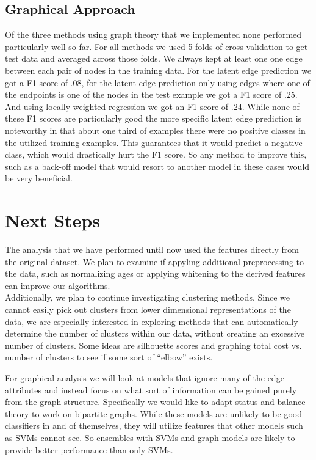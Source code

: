 \documentclass[twoside,twocolumn,paper=letter]{article}
\begin{document}
\subsection{Graphical Approach}

Of the three methods using graph theory that we implemented none performed particularly well so far. For all methods we used 5 folds of cross-validation to get test data and averaged across those folds. We always kept at least one one edge between each pair of nodes in the training data. For the latent edge prediction we got a F1 score of .08, for the latent edge prediction only using edges where one of the endpoints is one of the nodes in the test example we got a F1 score of .25. And using locally weighted regression we got an F1 score of .24. While none of these F1 scores are particularly good the more specific latent edge prediction is noteworthy in that about one third of examples there were no positive classes in the utilized training examples. This guarantees that it would predict a negative class, which would drastically hurt the F1 score. So any method to improve this, such as a back-off model that would resort to another model in these cases would be very beneficial.
\section{Next Steps}

The analysis that we have performed until now used the features directly from
the original dataset. We plan to examine if appyling additional preprocessing to
the data, such as normalizing ages or applying whitening to the derived features
can improve our algorithms.\\

Additionally, we plan to continue investigating clustering methods. Since we
cannot easily pick out clusters from lower dimensional representations of the
data, we are especially interested in exploring methods that can automatically
determine the number of clusters within our data, without creating an excessive
number of clusters. Some ideas are silhouette scores and graphing total cost vs. number of clusters to see if some sort of ``elbow'' exists.

For graphical analysis we will look at models that ignore many of the edge attributes and instead focus on what sort of information can be gained purely from the graph structure. Specifically we would like to adapt status and balance theory to work on bipartite graphs. While these models are unlikely to be good classifiers in and of themselves, they will utilize features that other models such as SVMs cannot see. So ensembles with SVMs and graph models are likely to provide better performance than only SVMs.
\end{document}
